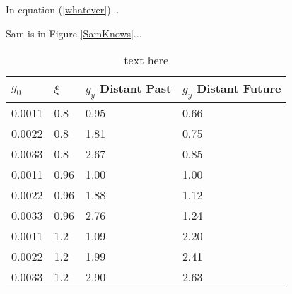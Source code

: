 \documentclass[11pt]{article}
\begin{document}
In equation (\ref{whatever})...   

Sam is in Figure \ref{SamKnows}...
        
\begin{table}
\centering
\begin{tabular}{|l l l l|}
\hline
$g_0$ & $\xi$ & $g_y$ Distant Past & $g_y$ Distant Future\\ \hline
0.0011 & 0.8  & 0.95 & 0.66 \\
0.0022 & 0.8  & 1.81 & 0.75 \\
0.0033 & 0.8  & 2.67 & 0.85 \\
0.0011 & 0.96  & 1.00 & 1.00 \\
0.0022 & 0.96  & 1.88 & 1.12 \\
0.0033 & 0.96  & 2.76 & 1.24 \\
0.0011 & 1.2  & 1.09 & 2.20 \\
0.0022 & 1.2  & 1.99 & 2.41 \\
0.0033 & 1.2 & 2.90 & 2.63 \\ \hline
\end{tabular}
\caption{text here}
\label{table3}
\end{table}





\end{document}
